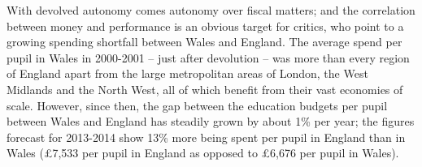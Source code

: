 \documentclass{sig-alternate}
\begin{document}
With devolved autonomy comes autonomy over fiscal matters;
and the correlation between money and performance is
an obvious target for critics, who point to a growing spending shortfall 
between Wales and England.
The average spend per pupil in Wales in 2000-2001
-- just after devolution --
was more than every region of England apart from
the large metropolitan areas of London, the West Midlands and the North West,
all of which benefit from their vast economies of scale.
However, since then, the gap between
the education budgets per pupil between Wales and England
has steadily grown by about 1\% per year;
the figures forecast for 2013-2014 show
13\% more being spent per pupil in England than in Wales
(\pounds7,533 per pupil in England as opposed to
\pounds6,676 per pupil in Wales).




\end{document}
